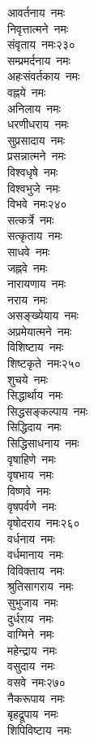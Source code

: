 \begin{multicols}{\maxColumns}
\begin{flushleft}
आवर्तनाय~नमः\\
निवृत्तात्मने~नमः\\
संवृताय~नमः\hfill २३०\\
सम्प्रमर्दनाय~नमः\\
अहःसंवर्तकाय~नमः\\
वह्नये~नमः\\
अनिलाय~नमः\\
धरणीधराय~नमः\\
सुप्रसादाय~नमः\\
प्रसन्नात्मने~नमः\\
विश्वधृषे~नमः\\
विश्वभुजे~नमः\\
विभवे~नमः\hfill २४०\\
सत्कर्त्रे~नमः\\
सत्कृताय~नमः\\
साधवे~नमः\\
जह्नवे~नमः\\
नारायणाय~नमः\\
नराय~नमः\\
असङ्ख्येयाय~नमः\\
अप्रमेयात्मने~नमः\\
विशिष्टाय~नमः\\
शिष्टकृते~नमः\hfill २५०\\
शुचये~नमः\\
सिद्धार्थाय~नमः\\
सिद्धसङ्कल्पाय~नमः\\
सिद्धिदाय~नमः\\
सिद्धिसाधनाय~नमः\\
वृषाहिणे~नमः\\
वृषभाय~नमः\\
विष्णवे~नमः\\
वृषपर्वणे~नमः\\
वृषोदराय~नमः\hfill २६०\\
वर्धनाय~नमः\\
वर्धमानाय~नमः\\
विविक्ताय~नमः\\
श्रुतिसागराय~नमः\\
सुभुजाय~नमः\\
दुर्धराय~नमः\\
वाग्मिने~नमः\\
महेन्द्राय~नमः\\
वसुदाय~नमः\\
वसवे~नमः\hfill २७०\\
नैकरूपाय~नमः\\
बृहद्रूपाय~नमः\\
शिपिविष्टाय~नमः\\

\end{flushleft}
\end{multicols}
